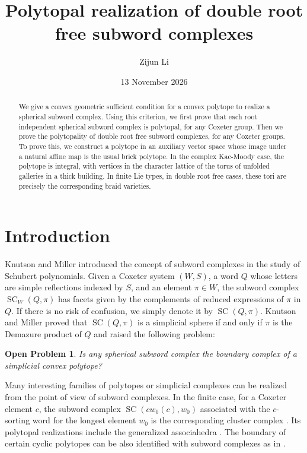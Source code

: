 \documentclass[11pt,a4paper]{article}
\title{Polytopal realization of double root free subword complexes}
\author{Zijun Li}
\date{13 November 2026}
\newtheorem{conjecture}[theorem]{Open Problem}
\theoremstyle{definition}
\theoremstyle{remark}
\newcommand{\SC}{\operatorname{SC}}
\numberwithin{equation}{section}
\newcommand{\SCQ}{\operatorname{SC}(Q,\pi)}
\begin{document}
\maketitle
\begin{abstract}
We give a convex geometric sufficient condition for a convex polytope to realize a spherical subword complex. Using this criterion, we first prove that each root independent spherical subword complex is polytopal, for any Coxeter group. Then we prove the polytopality of double root free subword complexes, for any Coxeter groups. To prove this, we construct a polytope in an auxiliary vector space whose image under a natural affine map is the usual brick polytope. In the complex Kac-Moody case, the polytope is integral, with vertices in the character lattice of the torus of unfolded galleries in a thick building. In finite Lie types, in double root free cases, these tori are precisely the corresponding braid varieties.
\end{abstract}


\section{Introduction}

Knutson and Miller \cite{KM} introduced the concept of subword complexes in the study of Schubert polynomials. Given a Coxeter system $(W,S)$, a word $Q$ whose letters are simple reflections indexed by $S$, and an element $\pi\in W$, the subword complex $\SC_W(Q,\pi)$ has facets given by the complements of reduced expressions of $\pi$ in $Q$. If there is no risk of confusion, we simply denote it by $\SCQ$. Knutson and Miller proved that $\SCQ$ is a simplicial sphere if and only if $\pi$ is the Demazure product of $Q$ and raised the following problem: 

\begin{conjecture}\label{conjecture}
Is any spherical subword complex the boundary complex of a simplicial convex polytope?
\end{conjecture}

Many interesting families of polytopes or simplicial complexes can be realized from the point of view of subword complexes. In the finite case, for a Coxeter element $c$, the subword complex $\SC(cw_0(c),w_0)$ associated with the $c$-sorting word for the longest element $w_0$ is the corresponding cluster complex \cite{CLS}. Its polytopal realizations include the generalized associahedra \cite{FZAssoc}. The boundary of certain cyclic polytopes can be also identified with subword complexes as in \cite{CLS}.
\end{document}
